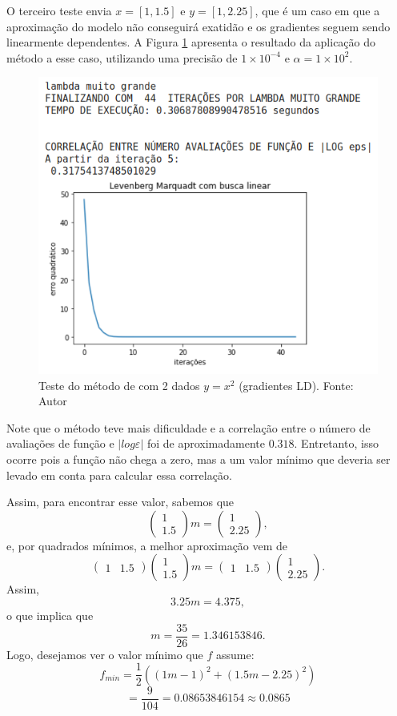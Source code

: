 \documentclass[11pt]{article}
\begin{document}
O terceiro teste envia $x = [1,1.5]$ e $y = [1,2.25]$, que é um caso em que a aproximação do modelo não conseguirá exatidão e os gradientes seguem sendo linearmente dependentes. A Figura \ref{lmbl3} apresenta o resultado da aplicação do método a esse caso, utilizando uma precisão de $1\times10^{-4}$ e $\alpha = 1\times10^{2}$. 

\begin{figure}[H]
\center
\includegraphics[scale=0.7]{Figuras/lmbl3.png}
\caption{Teste do método de \cite{bmLS} com 2 dados $y = x^2$ (gradientes LD). Fonte: Autor} 
\label{lmbl3}
\end{figure}

Note que o método teve mais dificuldade e a correlação entre o número de avaliações de função e $|log \varepsilon|$ foi de aproximadamente $0.318$. Entretanto, isso ocorre pois a função não chega a zero, mas a um valor mínimo que deveria ser levado em conta para calcular essa correlação.

Assim, para encontrar esse valor, sabemos que
$$\begin{pmatrix}1 \\ 1.5\end{pmatrix}m = \begin{pmatrix}1 \\ 2.25\end{pmatrix},$$
e, por quadrados mínimos, a melhor aproximação vem de
$$\begin{pmatrix}1 & 1.5\end{pmatrix}\begin{pmatrix}1 \\ 1.5\end{pmatrix}m = \begin{pmatrix}1 & 1.5\end{pmatrix}\begin{pmatrix}1 \\ 2.25\end{pmatrix}.$$
Assim,
$$3.25 m = 4.375,$$
o que implica que
$$m = \frac{35}{26} = 1.346153846.$$
Logo, desejamos ver o valor mínimo que $f$ assume:
$$f_{min} = \frac{1}{2}  ((1m - 1)^2 + (1.5m - 2.25)^2 ) $$
$$= \frac{9}{104} = 0.08653846154 \approx 0.0865  $$
\end{document}
